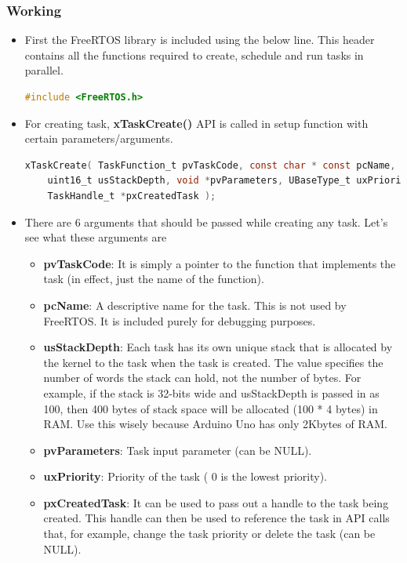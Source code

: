 \subsubsection{Working}
\begin{itemize}
    \item First the FreeRTOS library is included using the below line. This header contains all the functions required to create, schedule and run tasks in parallel.
    \begin{lstlisting}[language=C]
    #include <FreeRTOS.h>
    \end{lstlisting}
    \item For creating task, \textbf{xTaskCreate()} API is called in setup function with certain parameters/arguments.
    \begin{lstlisting}[language=C]
    xTaskCreate( TaskFunction_t pvTaskCode, const char * const pcName,
    uint16_t usStackDepth, void *pvParameters, UBaseType_t uxPriority,
    TaskHandle_t *pxCreatedTask );
    \end{lstlisting}
    \item There are 6 arguments that should be passed while creating any task. Let’s see what these arguments are
    \begin{itemize}
        \item \textbf{pvTaskCode}: It is simply a pointer to the function that implements the task (in effect, just the name of the function).
        \item \textbf{pcName}: A descriptive name for the task. This is not used by FreeRTOS. It is included purely for debugging purposes.
        \item \textbf{usStackDepth}: Each task has its own unique stack that is allocated by the kernel to the task when the task is created. The value specifies the number of words the stack can hold, not the number of bytes. For example, if the stack is 32-bits wide and usStackDepth is passed in as 100, then 400 bytes of stack space will be allocated (100 * 4 bytes) in RAM. Use this wisely because Arduino Uno has only 2Kbytes of RAM.
        \item \textbf{pvParameters}: Task input parameter (can be NULL).
        \item \textbf{uxPriority}: Priority of the task ( 0 is the lowest priority).
        \item \textbf{pxCreatedTask}: It can be used to pass out a handle to the task being created. This handle can then be used to reference the task in API calls that, for example, change the task priority or delete the task (can be NULL).

\end{itemize}
\end{itemize}
